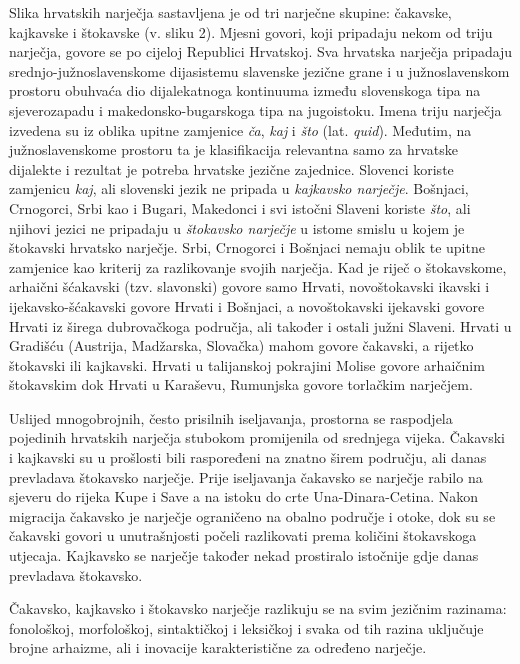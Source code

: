 \begin{multicols}{2}
Slika hrvatskih narječja sastavljena je od tri narječne skupine: čakavske, kajkavske i štokavske (v. sliku 2). Mjesni govori, koji pripadaju nekom od triju narječja, govore se po cijeloj Republici Hrvatskoj. Sva hrvatska narječja pripadaju srednjo-južnoslavenskome dijasistemu slavenske jezične grane i u južnoslavenskom prostoru obuhvaća dio dijalekatnoga kontinuuma između slovenskoga tipa na sjeverozapadu i makedonsko-bugarskoga tipa na jugoistoku. Imena triju narječja izvedena su iz oblika upitne zamjenice \emph{ča}, \emph{kaj} i \emph{što} (lat. \emph{quid}). Međutim, na južnoslavenskome prostoru ta je klasifikacija relevantna samo za hrvatske dijalekte i rezultat je potreba hrvatske jezične zajednice. Slovenci koriste zamjenicu \emph{kaj}, ali slovenski jezik ne pripada u \emph{kajkavsko narječje}. Bošnjaci, Crnogorci, Srbi kao i Bugari, Makedonci i svi istočni Slaveni koriste \emph{što}, ali njihovi jezici ne pripadaju u \emph{štokavsko narječje} u istome smislu u kojem je štokavski hrvatsko narječje. Srbi, Crnogorci i Bošnjaci nemaju oblik te upitne zamjenice kao kriterij za razlikovanje svojih narječja. Kad je riječ o štokavskome, arhaični šćakavski (tzv. slavonski) govore samo Hrvati, novoštokavski ikavski i ijekavsko-šćakavski govore Hrvati i Bošnjaci, a novoštokavski ijekavski govore Hrvati iz širega dubrovačkoga područja, ali također i ostali južni Slaveni. Hrvati u Gradišću (Austrija, Madžarska, Slovačka) mahom govore čakavski, a rijetko štokavski ili kajkavski. Hrvati u talijanskoj pokrajini Molise govore arhaičnim štokavskim dok Hrvati u Karaševu, Rumunjska govore torlačkim narječjem.
 
Uslijed mnogobrojnih, često prisilnih iseljavanja, prostorna se raspodjela pojedinih hrvatskih narječja stubokom promijenila od srednjega vijeka. Čakavski i kajkavski su u prošlosti bili raspoređeni na znatno širem području, ali danas prevladava štokavsko narječje. Prije iseljavanja čakavsko se narječje rabilo na sjeveru do rijeka Kupe i Save a na istoku do crte Una-Dinara-Cetina. Nakon migracija čakavsko je narječje ograničeno na obalno područje i otoke, dok su se čakavski govori u unutrašnjosti počeli razlikovati prema količini štokavskoga utjecaja. Kajkavsko se narječje također nekad prostiralo istočnije gdje danas prevladava štokavsko.

Čakavsko, kajkavsko i štokavsko narječje razlikuju se na svim jezičnim razinama: fonološkoj, morfološkoj, sintaktičkoj i leksičkoj i svaka od tih razina uključuje brojne arhaizme, ali i inovacije karakteristične za određeno narječje.


\end{multicols}

